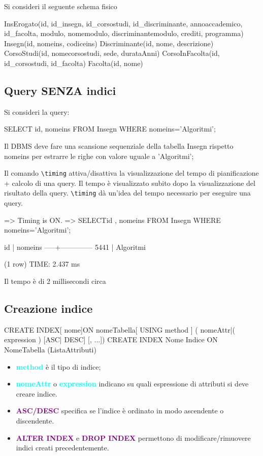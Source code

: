 Si consideri il seguente schema fisico
\begin{codiceSQL}
InsErogato(id, id_insegn, id_corsostudi, id_discriminante, annoaccademico, id_facolta, modulo, nomemodulo, discriminantemodulo, crediti, programma)
Insegn(id, nomeins, codiceins)
Discriminante(id, nome, descrizione)
CorsoStudi(id, nomecorsostudi, sede, durataAnni)
CorsoInFacolta(id, id_corsostudi, id_facolta)
Facolta(id, nome)
\end{codiceSQL}

\subsection*{Query SENZA indici}
Si consideri la query:
\begin{codiceSQL}
SELECT id, nomeins FROM Insegn WHERE nomeins='Algoritmi';  
\end{codiceSQL}
Il DBMS deve fare una scansione sequenziale della tabella Insegn rispetto nomeins per estrarre le righe con valore uguale a 'Algoritmi';


Il comando \texttt{\textbackslash timing} attiva/disattiva la visualizzazione del tempo di pianificazione + calcolo di una query.
Il tempo è visualizzato subito dopo la visualizzazione del risultato della query.
\texttt{\textbackslash timing} dà un’idea del tempo necessario per eseguire una query.



\begin{codiceSQL}
=>\timing
Timing is ON.
=> SELECTid , nomeins
FROM Insegn
WHERE nomeins='Algoritmi';


id | nomeins
-----+--------------
5441 | Algoritmi

(1 row)
TIME: 2.437 ms
\end{codiceSQL}

Il tempo è di 2 millisecondi circa

\subsection{Creazione indice}
\begin{codiceSQL}
  CREATE INDEX[ nome]ON nomeTabella[ USING method ]
({ nomeAttr|( expression )} [ASC| DESC] [, ...])
CREATE INDEX Nome Indice ON NomeTabella (ListaAttributi)
\end{codiceSQL}

\begin{itemize}
  \item \textcolor{cyan}{\textbf{method}} è il tipo di indice;
  \item \textcolor{cyan}{\textbf{nomeAttr}} o \textcolor{cyan}{ \textbf{expression}} indicano su quali espressione di attributi si deve creare indice.
  \item \textcolor{purple}{\textbf{ASC/DESC}} specifica se l’indice è ordinato in modo ascendente o discendente.
  \item \textcolor{purple}{\textbf{ALTER INDEX}} e \textcolor{purple}{\textbf{DROP INDEX}} permettono di modificare/rimuovere indici creati precedentemente.
\end{itemize}

